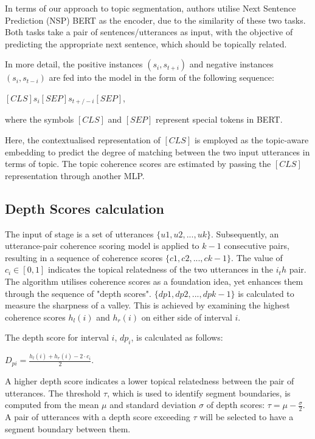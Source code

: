 \documentclass[PMI,VKR]{HSEUniversity}
\begin{document}
In terms of our approach to topic segmentation, authors utilise Next Sentence Prediction (NSP) BERT as the encoder, due to the similarity of these two tasks. 
Both tasks take a pair of sentences/utterances as input, with the objective of predicting the appropriate next sentence, which should be topically related. 

In more detail, the positive instances $(s_{i}, s_{t+i})$ and negative instances $(s_{i}, s_{t-i})$ are fed into the model in the form of the following sequence: 
\begin{center}
    $[CLS] s_{i} [SEP] s_{t+/-i} [SEP]$,
\end{center}
where the symbols $[CLS]$ and $[SEP]$ represent special tokens in BERT. 

Here, the contextualised representation of $[CLS]$ is employed as the topic-aware embedding to predict the degree of matching between the two input utterances in terms of topic. 
The topic coherence scores are estimated by passing the $[CLS]$ representation through another MLP.


\subsection{Depth Scores calculation}

The input of stage is a set of utterances $\{u1, u2, ..., uk\}$. 
Subsequently, an utterance-pair coherence scoring model is applied to $k - 1$ consecutive pairs, resulting in a sequence of coherence scores $\{c1, c2, ..., ck-1\}$. 
The value of $c_i \in [0, 1]$ indicates the topical relatedness of the two utterances in the $i_th$ pair. 
The algorithm utilises coherence scores as a foundation idea, yet enhances them through the sequence of "depth scores". $\{dp1, dp2, ..., dpk-1\}$ is calculated to measure the sharpness of a valley. 
This is achieved by examining the highest coherence scores $h_l(i)$ and $h_r(i)$ on either side of interval $i$.

The depth score for interval $i$, $dp_i$, is calculated as follows: 
\begin{center}
    $D_{pi} = \frac{h_{l}(i) + h_{r}(i) - 2 \cdot c_{i}}{2}$. 
\end{center}

A higher depth score indicates a lower topical relatedness between the pair of utterances. 
The threshold $\tau$, which is used to identify segment boundaries, is computed from the mean $\mu$ and standard deviation $\sigma$ of depth scores: $\tau = \mu - \frac{\sigma}{2}$. 
A pair of utterances with a depth score exceeding $\tau$ will be selected to have a segment boundary between them. 
\end{document}
